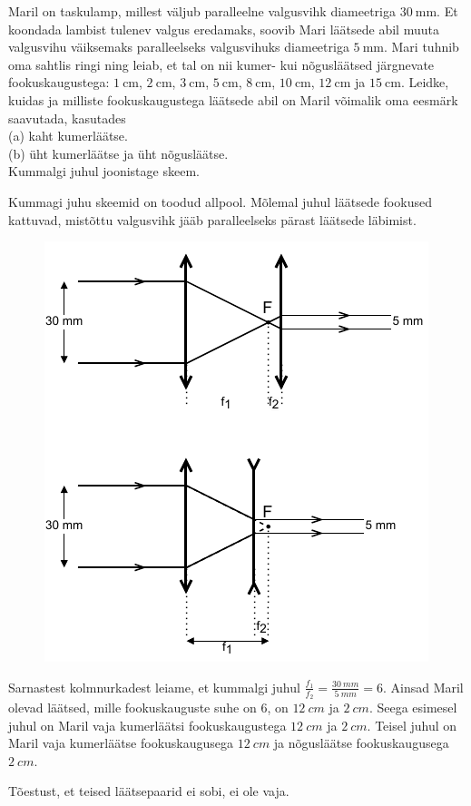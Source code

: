 
Maril on taskulamp, millest väljub paralleelne valgusvihk diameetriga $\SI{30}{\mm}$. Et koondada lambist tulenev valgus eredamaks, soovib Mari läätsede abil muuta valgusvihu väiksemaks paralleelseks valgusvihuks diameetriga $\SI{5}{\mm}$. Mari tuhnib oma sahtlis ringi ning leiab, et tal on nii kumer- kui nõgusläätsed järgnevate fookuskaugustega: $\SI{1}{\cm}$, $\SI{2}{\cm}$, $\SI{3}{\cm}$, $\SI{5}{\cm}$, $\SI{8}{\cm}$, $\SI{10}{\cm}$, $\SI{12}{\cm}$ ja $\SI{15}{\cm}$. Leidke, kuidas ja milliste fookuskaugustega läätsede abil on Maril võimalik oma eesmärk saavutada, kasutades
\\ (a) kaht kumerläätse.
\\ (b) üht kumerläätse ja üht nõgusläätse.
\\ Kummalgi juhul joonistage skeem.


\hint

\solu
Kummagi juhu skeemid on toodud allpool. Mõlemal juhul läätsede fookused kattuvad, mistõttu valgusvihk jääb paralleelseks pärast läätsede läbimist.

\begin{figure}[h]
    \centering
    \includegraphics[width=.5\linewidth]{2023-v2g-01-yl.pdf}
\end{figure}

Sarnastest kolmnurkadest leiame, et kummalgi juhul $\frac{f_1}{f_2} = \frac{\SI{30}{mm}}{\SI{5}{mm}} = 6$. Ainsad Maril olevad läätsed, mille fookuskauguste suhe on $6$, on $\SI{12}{cm}$ ja $\SI{2}{cm}$. Seega esimesel juhul on Maril vaja kumerläätsi fookuskaugustega $\SI{12}{cm}$ ja $\SI{2}{cm}$. Teisel juhul on Maril vaja kumerläätse fookuskaugusega $\SI{12}{cm}$ ja nõgusläätse fookuskaugusega $\SI{2}{cm}$.

Tõestust, et teised läätsepaarid ei sobi, ei ole vaja.
\probend